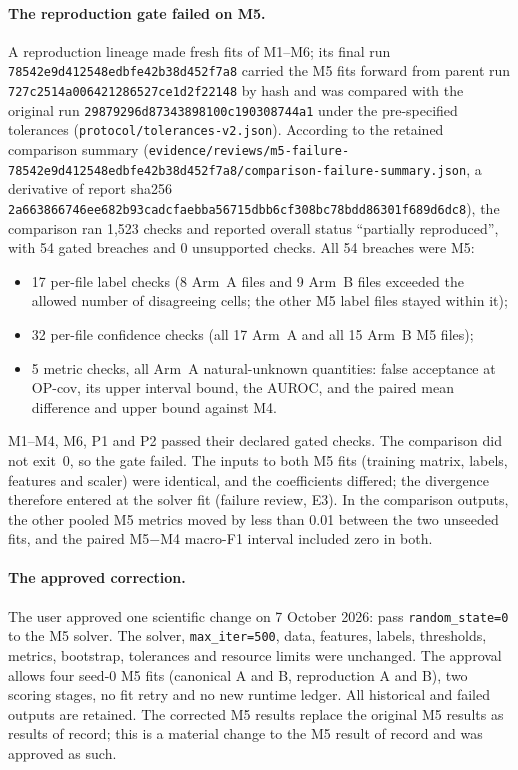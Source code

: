 \documentclass[11pt]{article}
\newcommand{\origrunid}{\nolinkurl{29879296d87343898100c190308744a1}}
\newcommand{\failrunid}{\nolinkurl{78542e9d412548edbfe42b38d452f7a8}}
\newcommand{\code}[1]{\texttt{#1}}
\begin{document}
\paragraph{The reproduction gate failed on M5.} A reproduction lineage made fresh fits of M1--M6; its final run \failrunid{} carried the M5 fits forward from parent run \nolinkurl{727c2514a006421286527ce1d2f22148} by hash and was compared with the original run \origrunid{} under the pre-specified tolerances (\nolinkurl{protocol/tolerances-v2.json}). According to the retained comparison summary (\nolinkurl{evidence/reviews/m5-failure-78542e9d412548edbfe42b38d452f7a8/comparison-failure-summary.json}, a derivative of report sha256 \nolinkurl{2a663866746ee682b93cadcfaebba56715dbb6cf308bc78bdd86301f689d6dc8}), the comparison ran 1{,}523 checks and reported overall status ``partially reproduced'', with 54 gated breaches and 0 unsupported checks. All 54 breaches were M5:
\begin{itemize}
\item 17 per-file label checks (8 Arm~A files and 9 Arm~B files exceeded the allowed number of disagreeing cells; the other M5 label files stayed within it);
\item 32 per-file confidence checks (all 17 Arm~A and all 15 Arm~B M5 files);
\item 5 metric checks, all Arm~A natural-unknown quantities: false acceptance at OP-cov, its upper interval bound, the AUROC, and the paired mean difference and upper bound against M4.
\end{itemize}
M1--M4, M6, P1 and P2 passed their declared gated checks. The comparison did not exit~0, so the gate failed. The inputs to both M5 fits (training matrix, labels, features and scaler) were identical, and the coefficients differed; the divergence therefore entered at the solver fit (failure review, E3). In the comparison outputs, the other pooled M5 metrics moved by less than 0.01 between the two unseeded fits, and the paired M5$-$M4 macro-F1 interval included zero in both.

\paragraph{The approved correction.} The user approved one scientific change on 7 October 2026: pass \code{random\_state=0} to the M5 solver. The solver, \code{max\_iter=500}, data, features, labels, thresholds, metrics, bootstrap, tolerances and resource limits were unchanged. The approval allows four seed-0 M5 fits (canonical A and B, reproduction A and B), two scoring stages, no fit retry and no new runtime ledger. All historical and failed outputs are retained. The corrected M5 results replace the original M5 results as results of record; this is a material change to the M5 result of record and was approved as such.
\end{document}
